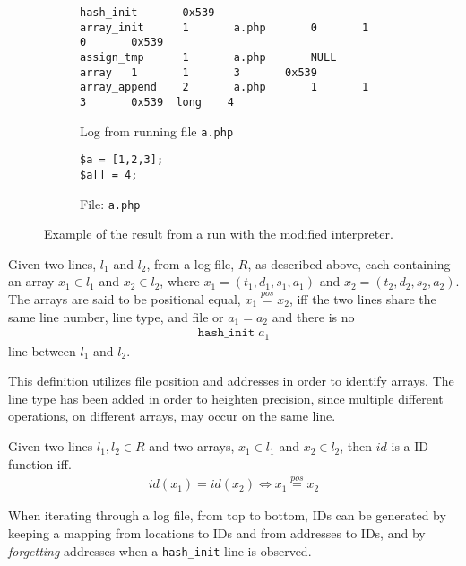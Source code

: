 \begin{figure}
\centering
\begin{subfigure}{\textwidth}
\begin{lstlisting}[mathescape, deletekeywords={array},basicstyle=\tiny]
hash_init       0x539
array_init      1       a.php       0       1       0       0x539
assign_tmp      1       a.php       NULL    array   1       1       3       0x539
array_append    2       a.php       1       1       3       0x539  long    4
\end{lstlisting}
\caption{Log from running file \texttt{a.php}}
\label{lst:id_array_code_out}
\end{subfigure}
\begin{subfigure}{\textwidth}
\begin{lstlisting}
$a = [1,2,3];
$a[] = 4;
\end{lstlisting}
\caption{File: \texttt{a.php}}
\label{lst:id_array_code}
\end{subfigure}
\caption{Example of the result from a run with the modified interpreter.}
\end{figure}
\begin{definition}
Given two lines, $l_1$ and $l_2$, from a log file, $R$, as described above, each containing an array $x_1\in l_1$ and $x_2\in l_2$, where $x_1 = (t_1,d_1,s_1,a_1)$ and $x_2 = (t_2,d_2,s_2,a_2)$. The arrays are said to be positional equal, $x_1\stackrel{pos}{=} x_2$, iff the two lines share the same line number, line type, and file or $a_1 = a_2$ and there is no 
\begin{align*}
\texttt{hash\_init}\;a_1
\end{align*}
line between $l_1$ and $l_2$.
\end{definition}
This definition utilizes file position and addresses in order to identify arrays. The line type has been added in order to heighten precision, since multiple different operations, on different arrays, may occur on the same line. 
\begin{definition}
Given two lines $l_1, l_2\in R$ and two arrays, $x_1\in l_1$ and $x_2 \in l_2$, then $id$ is a ID-function iff.
\begin{align*}
    id(x_1) = id(x_2) \Leftrightarrow x_1 \stackrel{pos}{=} x_2
\end{align*}
\end{definition}

When iterating through a log file, from top to bottom, IDs can be generated by keeping a mapping from locations to IDs and from addresses to IDs, and by \emph{forgetting} addresses when a \texttt{hash\_init} line is observed.